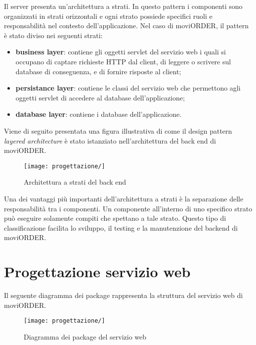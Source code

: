 Il server presenta un'architettura a strati. In questo pattern i componenti sono organizzati in strati orizzontali e ogni strato possiede specifici ruoli e responsabilità nel contesto dell'applicazione. Nel caso di moviORDER, il pattern è stato diviso nei seguenti strati:
\begin{itemize}
	\item \textbf{business layer}: contiene gli oggetti servlet del servizio web i quali si occupano di captare richieste HTTP dal client, di leggere o scrivere sul database di conseguenza, e di fornire risposte al client;
	\item \textbf{persistance layer}: contiene le classi del servizio web che permettono agli oggetti servlet di accedere al database dell'applicazione;
	\item \textbf{database layer}: contiene i database dell'applicazione.
\end{itemize}
Viene di seguito presentata una figura illustrativa di come il design pattern \textit{layered architecture} è stato istanziato nell'architettura del back end di moviORDER. 

\begin{figure}[!h] 
    \centering 
    \texttt{[image: progettazione/]} 
    \caption{Architettura a strati del back end}
\end{figure}

Una dei vantaggi più importanti dell'architettura a strati è la separazione delle responsabilità tra i componenti. Un componente all'interno di uno specifico strato può eseguire solamente compiti che spettano a tale strato. Questo tipo di classificazione facilita lo sviluppo, il testing e la manutenzione del backend di moviORDER.

\section{Progettazione servizio web}

Il seguente diagramma dei package rappresenta la struttura del servizio web di moviORDER.

\begin{figure}[!h] 
    \centering 
    \texttt{[image: progettazione/]} 
    \caption{Diagramma dei package del servizio web}
\end{figure}

